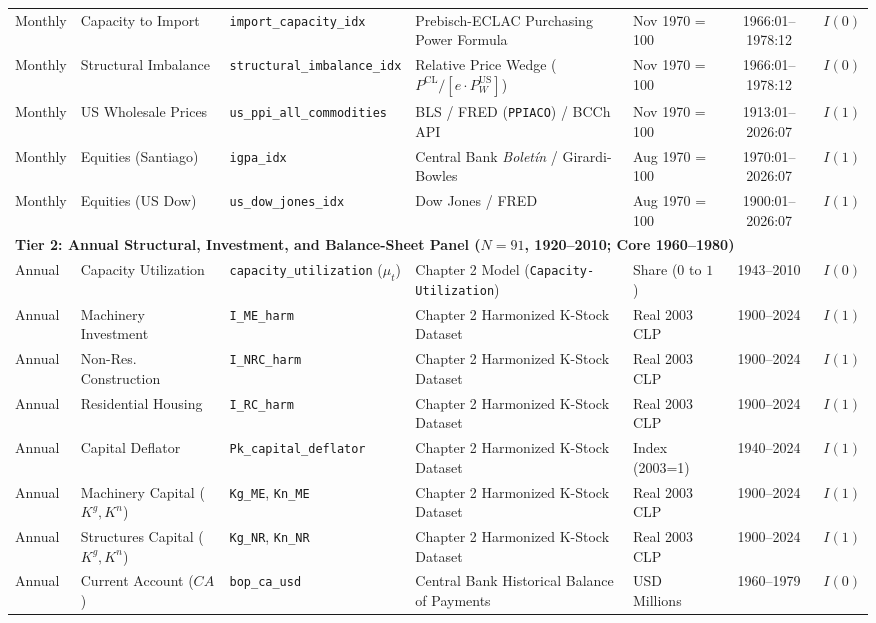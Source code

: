 \begin{table}[htbp]
{\begin{tabular}{lllllcc}
Monthly & Capacity to Import & \texttt{import\_capacity\_idx} & Prebisch-ECLAC Purchasing Power Formula & Nov 1970 = 100 & 1966:01--1978:12 & $I(0)$ \\
Monthly & Structural Imbalance & \texttt{structural\_imbalance\_idx} & Relative Price Wedge ($P^{\text{CL}} / [e \cdot P^{\text{US}}_W]$) & Nov 1970 = 100 & 1966:01--1978:12 & $I(0)$ \\
Monthly & US Wholesale Prices & \texttt{us\_ppi\_all\_commodities} & BLS / FRED (\texttt{PPIACO}) / BCCh API & Nov 1970 = 100 & 1913:01--2026:07 & $I(1)$ \\
Monthly & Equities (Santiago) & \texttt{igpa\_idx} & Central Bank \textit{Boletín} / Girardi-Bowles & Aug 1970 = 100 & 1970:01--2026:07 & $I(1)$ \\
Monthly & Equities (US Dow) & \texttt{us\_dow\_jones\_idx} & Dow Jones / FRED & Aug 1970 = 100 & 1900:01--2026:07 & $I(1)$ \\
\midrule
\multicolumn{7}{l}{\textbf{Tier 2: Annual Structural, Investment, and Balance-Sheet Panel ($N = 91$, 1920--2010; Core 1960--1980)}} \\[0.2em]
Annual & Capacity Utilization & \texttt{capacity\_utilization} ($\mu_t$) & Chapter 2 Model (\texttt{Capacity-Utilization}) & Share ($0$ to $1$) & 1943--2010 & $I(0)$ \\
Annual & Machinery Investment & \texttt{I\_ME\_harm} & Chapter 2 Harmonized K-Stock Dataset & Real 2003 CLP & 1900--2024 & $I(1)$ \\
Annual & Non-Res. Construction & \texttt{I\_NRC\_harm} & Chapter 2 Harmonized K-Stock Dataset & Real 2003 CLP & 1900--2024 & $I(1)$ \\
Annual & Residential Housing & \texttt{I\_RC\_harm} & Chapter 2 Harmonized K-Stock Dataset & Real 2003 CLP & 1900--2024 & $I(1)$ \\
Annual & Capital Deflator & \texttt{Pk\_capital\_deflator} & Chapter 2 Harmonized K-Stock Dataset & Index (2003=1) & 1940--2024 & $I(1)$ \\
Annual & Machinery Capital ($K^g, K^n$) & \texttt{Kg\_ME}, \texttt{Kn\_ME} & Chapter 2 Harmonized K-Stock Dataset & Real 2003 CLP & 1900--2024 & $I(1)$ \\
Annual & Structures Capital ($K^g, K^n$) & \texttt{Kg\_NR}, \texttt{Kn\_NR} & Chapter 2 Harmonized K-Stock Dataset & Real 2003 CLP & 1900--2024 & $I(1)$ \\
Annual & Current Account ($CA$) & \texttt{bop\_ca\_usd} & Central Bank Historical Balance of Payments & USD Millions & 1960--1979 & $I(0)$ \\

\end{tabular}}
\end{table}
